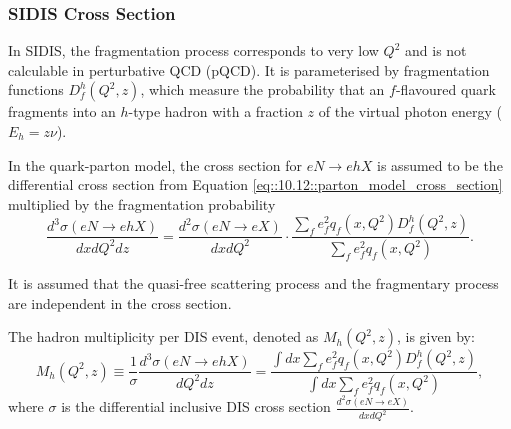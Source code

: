 \subsubsection{SIDIS Cross Section}
\label{10.21::sidis_cross_section}
    In SIDIS, the fragmentation process corresponds to very low $Q^2$ and is not calculable in perturbative QCD (pQCD).
    It is parameterised by fragmentation functions $D_f^h(Q^2, z)$, which measure the probability that an $f$-flavoured quark fragments into an $h$-type hadron with a fraction $z$ of the virtual photon energy ($E_h = z\nu$).

    In the quark-parton model, the cross section for $eN \rightarrow ehX$ is assumed to be the differential cross section from Equation \eqref{eq::10.12::parton_model_cross_section} multiplied by the fragmentation probability
    \begin{equation}
        \label{eq::10.21::fragmentation_probability}
        \frac{d^3\sigma(eN \rightarrow ehX)}{dxdQ^2dz} =
            \frac{d^2\sigma(eN \rightarrow eX)}{dxdQ^2} \cdot
            \frac{\sum_f e^2_f q_f(x,Q^2) D^h_f(Q^2,z)}{\sum_f e^2_f q_f(x,Q^2)}.
    \end{equation}

    It is assumed that the quasi-free scattering process and the fragmentary process are independent in the cross section.

    The hadron multiplicity per DIS event, denoted as $M_h(Q^2, z)$, is given by:
    \begin{equation*}
        M_h(Q^2,z) \equiv \frac{1}{\sigma} \frac{d^3\sigma(eN \rightarrow ehX)}{dQ^2dz} = \frac{\int dx \sum_f e^2_f q_f(x,Q^2) D^h_f(Q^2,z)}{\int dx \sum_f e^2_f q_f(x,Q^2)},
    \end{equation*}
    where $\sigma$ is the differential inclusive DIS cross section $\frac{d^2\sigma(eN \rightarrow eX)}{dxdQ^2}$.
